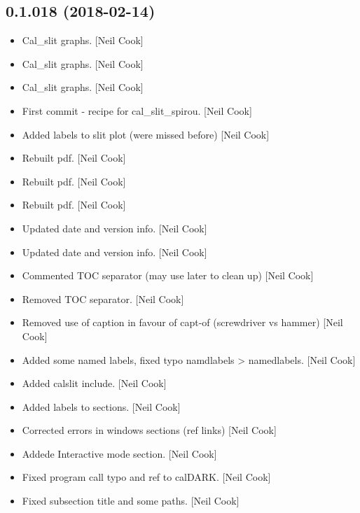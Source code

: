 \documentclass[a4paper,10pt,english]{report}
\begin{document}
\subsection{0.1.018 (2018-02-14)}
\label{\detokenize{misc/changelog:id484}}\begin{itemize}
\item {} 
Cal\_slit graphs. {[}Neil Cook{]}

\item {} 
Cal\_slit graphs. {[}Neil Cook{]}

\item {} 
Cal\_slit graphs. {[}Neil Cook{]}

\item {} 
First commit - recipe for cal\_slit\_spirou. {[}Neil Cook{]}

\item {} 
Added labels to slit plot (were missed before) {[}Neil Cook{]}

\item {} 
Rebuilt pdf. {[}Neil Cook{]}

\item {} 
Rebuilt pdf. {[}Neil Cook{]}

\item {} 
Rebuilt pdf. {[}Neil Cook{]}

\item {} 
Updated date and version info. {[}Neil Cook{]}

\item {} 
Updated date and version info. {[}Neil Cook{]}

\item {} 
Commented TOC separator (may use later to clean up) {[}Neil Cook{]}

\item {} 
Removed TOC separator. {[}Neil Cook{]}

\item {} 
Removed use of caption in favour of capt-of (screwdriver vs hammer)
{[}Neil Cook{]}

\item {} 
Added some named labels, fixed typo namdlabels \textendash{}\textgreater{} namedlabels. {[}Neil
Cook{]}

\item {} 
Added calslit include. {[}Neil Cook{]}

\item {} 
Added labels to sections. {[}Neil Cook{]}

\item {} 
Corrected errors in windows sections (ref links) {[}Neil Cook{]}

\item {} 
Addede Interactive mode section. {[}Neil Cook{]}

\item {} 
Fixed program call typo and ref to calDARK. {[}Neil Cook{]}

\item {} 
Fixed subsection title and some paths. {[}Neil Cook{]}

\end{itemize}
\end{document}
